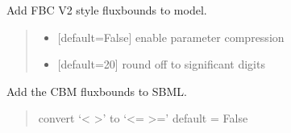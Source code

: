 \documentclass[letterpaper,12pt,english]{sphinxmanual}
\begin{document}
\begin{fulllineitems}
\begin{fulllineitems}
\label{\detokenize{api/io:cbmpy.CBXML.CBMtoSBML3.addBoundsV2}}
\pysigstartsignatures
\pysiglinewithargsret
{}
{\sphinxparamcomma {}}
{}
\pysigstopsignatures
\sphinxAtStartPar
Add FBC V2 style fluxbounds to model.
\begin{quote}\begin{description}
\begin{itemize}
\item {} 
\sphinxAtStartPar
{} \textendash{} {[}default=False{]} enable parameter compression

\item {} 
\sphinxAtStartPar
{} \textendash{} {[}default=20{]} round off to significant digits

\end{itemize}

\end{description}\end{quote}

\end{fulllineitems}


\begin{fulllineitems}
\label{\detokenize{api/io:cbmpy.CBXML.CBMtoSBML3.addBoundsV1}}
\pysigstartsignatures
\pysiglinewithargsret
{}
{}
{}
\pysigstopsignatures
\sphinxAtStartPar
Add the CBM fluxbounds to SBML.
\begin{quote}\begin{description}
\sphinxAtStartPar
{} \textendash{} convert ‘\textless{} \textgreater{}’ to ‘\textless{}= \textgreater{}=’ default = False

\end{description}\end{quote}

\end{fulllineitems}


\end{fulllineitems}
\end{document}
